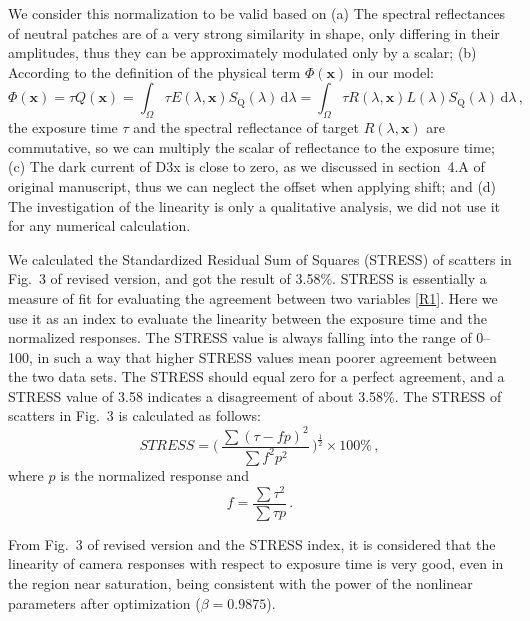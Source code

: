 \documentclass[12pt]{article}
\newcommand{\D}{\mathrm{d}}
\begin{document}
{		We consider this normalization to be valid based on (a) The spectral reflectances of neutral patches are of a very strong similarity in shape, only differing in their amplitudes, thus they can be approximately modulated only by a scalar; (b) According to the definition of the physical term $\Phi(\mathbf{x})$ in our model:
		\begin{equation*}
		\Phi(\mathbf{x}) = \tau Q(\mathbf{x}) = \int_\Omega\tau E(\lambda,\mathbf{x})S_\text{Q}(\lambda)\,\D{\lambda} = \int_\Omega\tau R(\lambda,\mathbf{x})L(\lambda)S_\text{Q}(\lambda)\,\D{\lambda}\,,
		\end{equation*}
		the exposure time $\tau$ and the spectral reflectance of target $R(\lambda,\mathbf{x})$ are commutative, so we can multiply the scalar of reflectance to the exposure time; (c) The dark current of D3x is close to zero, as we discussed in section~4.A of original manuscript, thus we can neglect the offset when applying shift; and (d) The investigation of the linearity is only a qualitative analysis, we did not use it for any numerical calculation.
		
		We calculated the Standardized Residual Sum of Squares (STRESS) of scatters in Fig.~3 of revised version, and got the result of 3.58\%. STRESS is essentially a measure of fit for evaluating the agreement between two variables [\hyperlink{ref1}{R1}]. Here we use it as an index to evaluate the linearity between the exposure time and the normalized responses. The STRESS value is always falling into the range of 0--100, in such a way that higher STRESS values mean poorer agreement between the two data sets. The STRESS should equal zero for a perfect agreement, and a STRESS value of 3.58 indicates a disagreement of about 3.58\%. The STRESS of scatters in Fig.~3 is calculated as follows:
		\begin{equation*}
		\textit{STRESS} = \bigg(\,\frac{\sum(\tau-fp)^2}{\sum f^2p^2}\,\bigg)^{\frac{1}{2}}\times 100\%\,,
		\end{equation*}
		where $p$ is the normalized response and
		\begin{equation*}
		f = \frac{\sum\tau^2}{\sum\tau p}\,.
		\end{equation*}

		From Fig.~3 of revised version and the STRESS index, it is considered that the linearity of camera responses with respect to exposure time is very good, even in the region near saturation, being consistent with the power of the nonlinear parameters after optimization ($\beta=0.9875$).}
	
\end{document}

